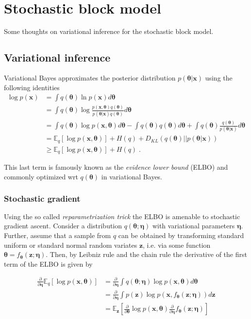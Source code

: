 \documentclass{article}
\renewcommand{\v}[1]{\bm{#1}}
\newcommand{\E}{\mathbb{E}}
\begin{document}
\section{Stochastic block model}

Some thoughts on variational inference for the stochastic block model.

\subsection{Variational inference}

Variational Bayes approximates the posterior distribution $p(\v{\theta} |
\v{x})$ using the following identities
\begin{equation}
\begin{split}
\log p(\v{x}) &= \int q(\v{\theta}) \ln p(\v{x}) d\v{\theta} \\
&= \int q(\v{\theta}) \log \frac{p(\v{x}, \v{\theta}) q(\v{\theta})}{p(\v{\theta} | \v{x}) q(\v{\theta})} d\v{\theta} \\
&= \int q(\v{\theta}) \log p(\v{x}, \v{\theta}) d\v{\theta} - \int q(\v{\theta}) q(\v{\theta}) d\v{\theta} + \int q(\v{\theta}) \frac{q(\v{\theta})}{p(\v{\theta} | \v{x})} d\v{\theta} \\
&= \E_q[\log p(\v{x}, \v{\theta})] + H(q) + D_{KL}(q(\v{\theta}) || p(\v{\theta} | \v{x})) \\
&\geq \E_q[\log p(\v{x}, \v{\theta})] + H(q) \; .
\end{split}
\end{equation}

This last term is famously known as the {\em evidence lower bound} (ELBO)
and commonly optimized wrt $q(\v{\theta})$ in variational Bayes.

\subsubsection{Stochastic gradient}

Using the so called {\em reparametrization trick} the ELBO is amenable to
stochastic gradient ascent. Consider a distribution $q(\v{\theta}; \v{\eta})$
with variational parameters $\v{\eta}$. Further, assume that a sample from
$q$ can be obtained by transforming standard uniform or standard
normal random variates $\v{z}$, i.e. via some function $\v{\theta} =
f_{\v{\theta}}(\v{z}; \v{\eta})$. Then, by Leibniz rule and the chain rule the
derivative of the first term of the ELBO is given by

\begin{equation}
\begin{split}
\frac{\partial}{\partial \v{\eta}} \E_q[ \log p(\v{x}, \v{\theta}) ]
&= \frac{\partial}{\partial \v{\eta}} \int q(\v{\theta}; \v{\eta}) \log p(\v{x}, \v{\theta}) d\v{\theta} \\
&= \frac{\partial}{\partial \v{\eta}} \int p(\v{z}) \log p(\v{x}, f_{\v{\theta}}(\v{z}; \v{\eta})) d\v{z} \\
&= \E_{\v{z}}\left[ \frac{\partial}{\partial \v{\theta}} \log p(\v{x}, \v{\theta}) \frac{\partial}{\partial \v{\eta}} f_{\v{\theta}}(\v{z}; \v{\eta}) \right]
\end{split}
\end{equation}
\end{document}
